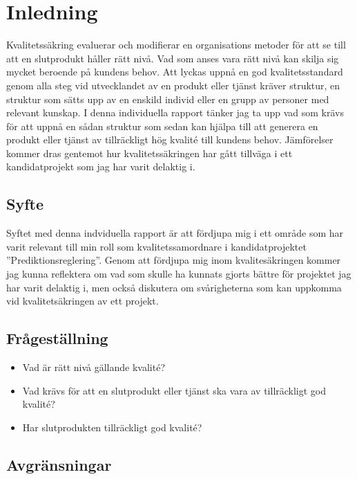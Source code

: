 \section{Inledning}
Kvalitetssäkring evaluerar och modifierar en organisations metoder för att se till att en slutprodukt håller rätt nivå. Vad som anses vara rätt nivå  kan skilja sig mycket beroende på kundens behov. 
\newline
\newline
Att lyckas uppnå en god kvalitetsstandard genom alla steg vid utvecklandet av en produkt eller tjänst kräver struktur, en struktur som sätts upp av en enskild individ eller en grupp av personer med relevant kunskap. I denna individuella rapport tänker jag ta upp vad som krävs för att uppnå en sådan struktur som sedan kan hjälpa till att generera en produkt eller tjänst av tillräckligt hög kvalité till kundens behov. Jämförelser kommer dras gentemot hur kvalitetssäkringen har gått tillväga i ett kandidatprojekt som jag har varit delaktig i.

\subsection{Syfte}
Syftet med denna indviduella rapport är att fördjupa mig i ett område som har varit relevant till min roll som kvalitetssamordnare i kandidatprojektet ''Prediktionsreglering''. 
\newline
\newline
Genom att fördjupa mig inom kvalitesäkringen kommer jag kunna reflektera om vad som skulle ha kunnats gjorts bättre för projektet jag har varit delaktig i, men också diskutera om svårigheterna som kan uppkomma vid kvalitetsäkringen av ett projekt.

\subsection{Frågeställning}

\begin{itemize}
  \item Vad är rätt nivå gällande kvalité?
  \item Vad krävs för att en slutprodukt eller tjänst ska vara av tillräckligt god kvalité?

  \item Har slutprodukten tillräckligt god kvalité?
\end{itemize}

\subsection{Avgränsningar}

